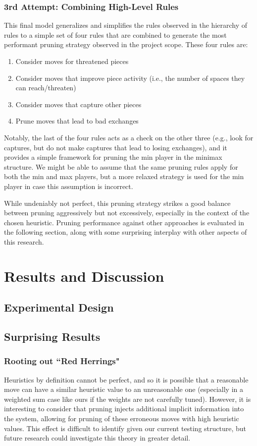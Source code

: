\documentclass[letterpaper]{article}
\begin{document}
\subsubsection{3rd Attempt: Combining High-Level Rules}
This final model generalizes and simplifies the rules observed in the hierarchy of rules to a simple set of four rules that are combined to generate the most performant pruning strategy observed in the project scope.  These four rules are:
\begin{enumerate}
    \item Consider moves for threatened pieces
    \item Consider moves that improve piece activity (i.e., the number of spaces they can reach/threaten)
    \item Consider moves that capture other pieces
    \item Prune moves that lead to bad exchanges
\end{enumerate}
Notably, the last of the four rules acts as a check on the other three (e.g., look for captures, but do not make captures that lead to losing exchanges), and it provides a simple framework for pruning the min player in the minimax structure.  We might be able to assume that the same pruning rules apply for both the min and max players, but a more relaxed strategy is used for the min player in case this assumption is incorrect.

While undeniably not perfect, this pruning strategy strikes a good balance between pruning aggressively but not excessively, especially in the context of the chosen heuristic.  Pruning performance against other approaches is evaluated in the following section, along with some surprising interplay with other aspects of this research.

\section{Results and Discussion}
\subsection{Experimental Design}

\subsection{Surprising Results}
\subsubsection{Rooting out ``Red Herrings"}
Heuristics by definition cannot be perfect, and so it is possible that a reasonable move can have a similar heuristic value to an unreasonable one (especially in a weighted sum case like ours if the weights are not carefully tuned).  However, it is interesting to consider that pruning injects additional implicit information into the system, allowing for pruning of these erroneous moves with high heuristic values.  This effect is difficult to identify given our current testing structure, but future research could investigate this theory in greater detail.
\end{document}
